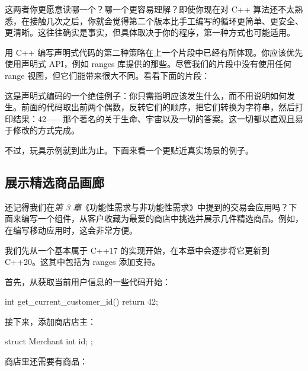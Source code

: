 这两者你更愿意读哪一个？哪一个更容易理解？即使你现在对 C++ 算法还不太熟悉，在接触几次之后，你就会觉得第二个版本比手工编写的循环更简单、更安全、更清晰。这往往确实是事实，但具体取决于你的程序，第一种方式也可能适用。

\label{idx:479}
用 C++ 编写声明式代码的第二种策略在上一个片段中已经有所体现。你应该优先使用声明式 API，例如 ranges 库提供的那些。尽管我们的片段中没有使用任何 range 视图，但它们能带来很大不同。看看下面的片段：


这是声明式编码的一个绝佳例子：你只需指明应该发生什么，而不用说明如何发生。前面的代码取出前两个偶数，反转它们的顺序，把它们转换为字符串，然后打印结果：42——那个著名的关于生命、宇宙以及一切的答案。这一切都以直观且易于修改的方式完成。

不过，玩具示例就到此为止。下面来看一个更贴近真实场景的例子。

\subsection{展示精选商品画廊}

\label{idx:480}
\label{idx:481}
还记得我们在\emph{第 3 章}《功能性需求与非功能性需求》中提到的交易会应用吗？下面来编写一个组件，从客户收藏为最爱的商店中挑选并展示几件精选商品。例如，在编写移动应用时，这会非常方便。

我们先从一个基本属于 C++17 的实现开始，在本章中会逐步将它更新到 C++20。这其中包括为 ranges 添加支持。

首先，从获取当前用户信息的一些代码开始：

\begin{codebox}[text]
int get_current_customer_id() {
    return 42;
}
\end{codebox}

接下来，添加商店店主：

\begin{codebox}[cpp]
struct Merchant {
    int id{};
};
\end{codebox}

商店里还需要有商品：

